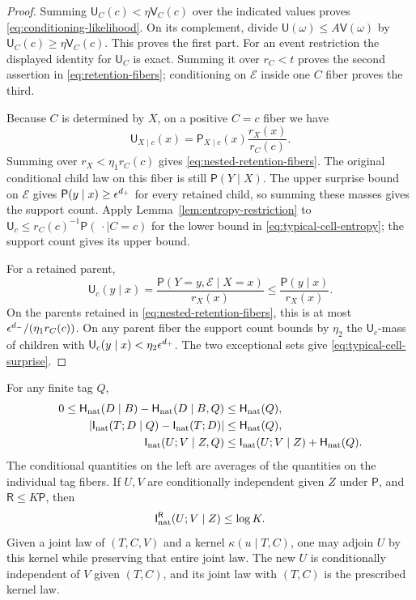 \begin{proof}
Summing $\mathsf U_C(c)<\eta\mathsf V_C(c)$ over the indicated
values proves \eqref{eq:conditioning-likelihood}.  On its complement,
divide $\mathsf U(\omega)\le A\mathsf V(\omega)$ by
$\mathsf U_C(c)\ge\eta\mathsf V_C(c)$.  This proves the first part.
For an event restriction the displayed identity for $\mathsf U_C$
is exact.  Summing it over $r_C<t$ proves the second assertion in
\eqref{eq:retention-fibers}; conditioning on $\mathcal E$ inside one
$C$ fiber proves the third.

Because $C$ is determined by $X$, on a positive $C=c$ fiber we have
\[
 \mathsf U_{X\mid c}(x)
 =\mathsf P_{X\mid c}(x)\frac{r_X(x)}{r_C(c)}.
\]
Summing over $r_X<\eta_1r_C(c)$ gives
\eqref{eq:nested-retention-fibers}.  The original conditional child
law on this fiber is still $\mathsf P(Y\mid X)$.
The upper surprise bound on $\mathcal E$ gives
$\mathsf P(y\mid x)\ge\epsilon^{d_+}$ for every retained child, so summing
these masses gives the support count.  Apply
Lemma~\ref{lem:entropy-restriction} to
$\mathsf U_c\le r_C(c)^{-1}\mathsf P(\,\cdot\mid C=c)$ for the lower
bound in \eqref{eq:typical-cell-entropy}; the support count gives its
upper bound.

For a retained parent,
\[
 \mathsf U_c(y\mid x)
 =\frac{\mathsf P(Y=y,\mathcal E\mid X=x)}{r_X(x)}
 \le\frac{\mathsf P(y\mid x)}{r_X(x)}.
\]
On the parents retained in \eqref{eq:nested-retention-fibers}, this
is at most $\epsilon^{d_-}/(\eta_1r_C(c))$.
On any parent fiber the support count bounds by $\eta_2$ the
$\mathsf U_c$-mass of children with
$\mathsf U_c(y\mid x)<\eta_2\epsilon^{d_+}$.  The two exceptional sets
give \eqref{eq:typical-cell-surprise}.
\end{proof}

\begin{lemma}
\label{lem:entropy-splitting}
For any finite tag $Q$,
\begin{align*}
 0\le\mathsf H_{\mathrm{nat}}(D\mid B)-\mathsf H_{\mathrm{nat}}(D\mid B,Q)&\le\mathsf H_{\mathrm{nat}}(Q),\\
 |\mathsf I_{\mathrm{nat}}(T;D\mid Q)-\mathsf I_{\mathrm{nat}}(T;D)|&\le\mathsf H_{\mathrm{nat}}(Q),\\
 \mathsf I_{\mathrm{nat}}(U;V\mid Z,Q)&\le\mathsf I_{\mathrm{nat}}(U;V\mid Z)+\mathsf H_{\mathrm{nat}}(Q).
\end{align*}
The conditional quantities on the left are averages of the quantities
on the individual tag fibers.  If $U,V$ are conditionally independent
given $Z$ under $\mathsf P$, and $\mathsf R\le K\mathsf P$, then
\[
 \mathsf I_{\mathrm{nat}}^{\mathsf R}(U;V\mid Z)\le\log K.
\]
Given a joint law of $(T,C,V)$ and a kernel $\kappa(u\mid T,C)$,
one may adjoin $U$ by this kernel while preserving that entire joint
law.  The new $U$ is conditionally independent of $V$ given $(T,C)$,
and its joint law with $(T,C)$ is the prescribed kernel law.
\end{lemma}

